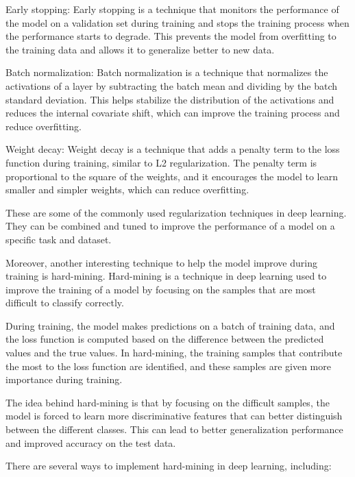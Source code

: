 Early stopping: Early stopping is a technique that monitors the performance of the model on a validation set during training and stops the training process when the performance starts to degrade. This prevents the model from overfitting to the training data and allows it to generalize better to new data.

Batch normalization: Batch normalization is a technique that normalizes the activations of a layer by subtracting the batch mean and dividing by the batch standard deviation. This helps stabilize the distribution of the activations and reduces the internal covariate shift, which can improve the training process and reduce overfitting.

Weight decay: Weight decay is a technique that adds a penalty term to the loss function during training, similar to L2 regularization. The penalty term is proportional to the square of the weights, and it encourages the model to learn smaller and simpler weights, which can reduce overfitting.

These are some of the commonly used regularization techniques in deep learning. They can be combined and tuned to improve the performance of a model on a specific task and dataset.

Moreover, another interesting technique to help the model improve during training is hard-mining. Hard-mining is a technique in deep learning used to improve the training of a model by focusing on the samples that are most difficult to classify correctly.

During training, the model makes predictions on a batch of training data, and the loss function is computed based on the difference between the predicted values and the true values. In hard-mining, the training samples that contribute the most to the loss function are identified, and these samples are given more importance during training.

The idea behind hard-mining is that by focusing on the difficult samples, the model is forced to learn more discriminative features that can better distinguish between the different classes. This can lead to better generalization performance and improved accuracy on the test data.

There are several ways to implement hard-mining in deep learning, including:

